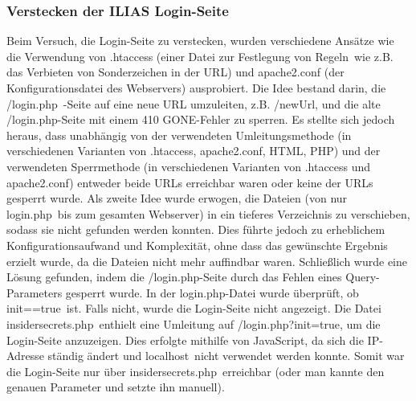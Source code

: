 \documentclass[10pt, a4paper,onecolumn ,titlepage]{article}
\begin{document}
    \subsubsection{Verstecken der ILIAS Login-Seite}
    \label{subsubsec:lessonslearnedLogin}
    Beim Versuch, die Login-Seite zu verstecken, wurden verschiedene Ansätze wie die Verwendung von .htaccess (einer Datei zur Festlegung von \glqq Regeln\grqq\ wie z.B. das Verbieten von Sonderzeichen in der URL) und apache2.conf (der Konfigurationsdatei des Webservers) ausprobiert.
    Die Idee bestand darin, die \glqq/login.php\grqq\ -Seite auf eine neue URL umzuleiten, z.B. \glqq/newUrl\grqq, und die alte \glqq/login.php\grqq-Seite mit einem 410 GONE-Fehler zu sperren.
    Es stellte sich jedoch heraus, dass unabhängig von der verwendeten Umleitungsmethode (in verschiedenen Varianten von .htaccess, apache2.conf, HTML, PHP) und der verwendeten Sperrmethode (in verschiedenen Varianten von .htaccess und apache2.conf) entweder beide URLs erreichbar waren oder keine der URLs gesperrt wurde.
    Als zweite Idee wurde erwogen, die Dateien (von nur \glqq login.php\grqq\ bis zum gesamten Webserver) in ein tieferes Verzeichnis zu verschieben, sodass sie nicht gefunden werden konnten.
    Dies führte jedoch zu erheblichem Konfigurationsaufwand und Komplexität, ohne dass das gewünschte Ergebnis erzielt wurde, da die Dateien nicht mehr auffindbar waren.
    Schließlich wurde eine Lösung gefunden, indem die \glqq /login.php\grqq-Seite durch das Fehlen eines Query-Parameters gesperrt wurde.
    In der \glqq login.php\grqq-Datei wurde überprüft, ob \glqq init==true\grqq\ ist.
    Falls nicht, wurde die Login-Seite nicht angezeigt.
    Die Datei \glqq insidersecrets.php\grqq\ enthielt eine Umleitung auf \glqq /login.php?init=true\grqq, um die Login-Seite anzuzeigen.
    Dies erfolgte mithilfe von JavaScript, da sich die IP-Adresse ständig ändert und \glqq localhost\grqq\ nicht verwendet werden konnte.
    Somit war die Login-Seite nur über \glqq insidersecrets.php\grqq\ erreichbar (oder man kannte den genauen Parameter und setzte ihn manuell).

\end{document}
